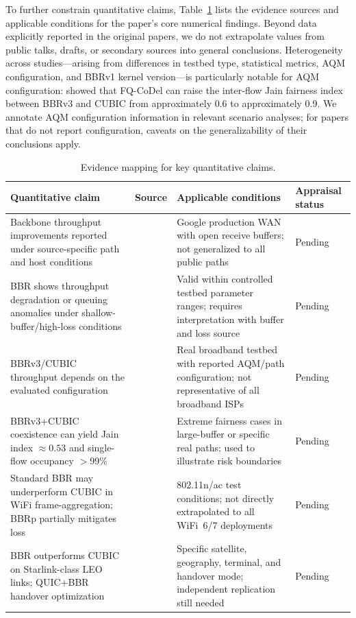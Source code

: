 \documentclass[a4paper,fleqn]{cas-sc}
\begin{document}
To further constrain quantitative claims, Table~\ref{tab:evidence_matrix} lists
the evidence sources and applicable conditions for the paper's core numerical
findings. Beyond data explicitly reported in the original papers, we do not
extrapolate values from public talks, drafts, or secondary sources into general
conclusions. Heterogeneity across studies---arising from differences in testbed
type, statistical metrics, AQM configuration, and BBRv1 kernel version---is
particularly notable for AQM configuration: \citet{pokhrel2025wifi} showed that
FQ-CoDel can raise the inter-flow Jain fairness index between BBRv3 and CUBIC
from approximately 0.6 to approximately 0.9. We annotate AQM configuration
information in relevant scenario analyses; for papers that do not report
configuration, caveats on the generalizability of their conclusions apply.

\begin{table}[pos=tbp]
  \caption{Evidence mapping for key quantitative claims.}
  \label{tab:evidence_matrix}
  \small
  \begin{tabularx}{\tblwidth}{@{}p{4.2cm}p{2.8cm}Xp{1.5cm}@{}}
    \toprule
    \textbf{Quantitative claim} & \textbf{Source} & \textbf{Applicable conditions} & \textbf{Appraisal status} \\
    \midrule
    Backbone throughput improvements reported under source-specific path and host conditions &
      \citet{cardwell2017bbr} &
      Google production WAN with open receive buffers; not generalized to all public paths &
      Pending \\
    BBR shows throughput degradation or queuing anomalies under shallow-buffer/high-loss conditions &
      \citet{cao2019bbr,jaeger2019bbr} &
      Valid within controlled testbed parameter ranges; requires interpretation with buffer and loss source &
      Pending \\
    BBRv3/CUBIC throughput depends on the evaluated configuration &
      \citet{gomez2024bbrv3} &
      Real broadband testbed with reported AQM/path configuration; not representative of all broadband ISPs &
      Pending \\
    BBRv3+CUBIC coexistence can yield Jain index $\approx\!0.53$ and single-flow occupancy $>$99\% &
      \citet{abrol2026bbr,zeynali2024bbrv3} &
      Extreme fairness cases in large-buffer or specific real paths; used to illustrate risk boundaries &
      Pending \\
    Standard BBR may underperform CUBIC in WiFi frame-aggregation; BBRp partially mitigates loss &
      \citet{grazia2020bbrp} &
      802.11n/ac test conditions; not directly extrapolated to all WiFi~6/7 deployments &
      Pending \\
    BBR outperforms CUBIC on Starlink-class LEO links; QUIC+BBR handover optimization &
      \citet{deutschmann2023starlink,kamel2024starquic} &
      Specific satellite, geography, terminal, and handover mode; independent replication still needed &
      Pending \\
    \bottomrule
  \end{tabularx}
\end{table}
\end{document}
